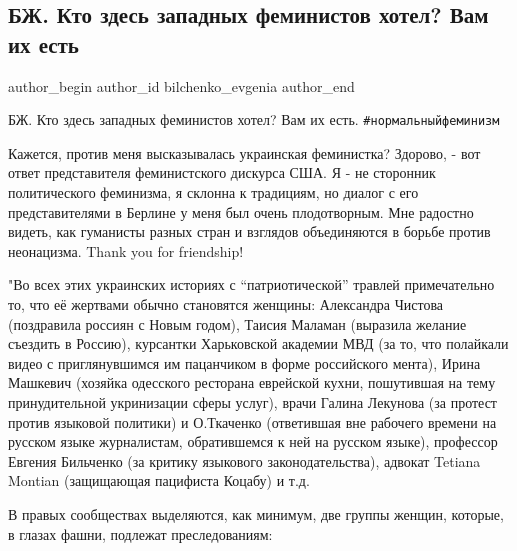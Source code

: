  
 
 
 
 
 
\subsection{БЖ. Кто здесь западных феминистов хотел? Вам их есть}
\label{sec:30_01_2021.fb.bilchenko_evgenia.1.feminizm_ukraina_zapad_travlja}
\ifcmt
 author_begin
   author_id bilchenko_evgenia
 author_end
\fi

БЖ. Кто здесь западных феминистов хотел? Вам их есть. \verb|#нормальныйфеминизм|

Кажется, против меня высказывалась украинская феминистка? Здорово, - вот ответ
представителя феминистского дискурса США. Я - не сторонник политического
феминизма, я склонна к традициям, но диалог с его представителями в Берлине у
меня был очень плодотворным. Мне радостно видеть, как гуманисты разных стран и
взглядов объединяются в борьбе против неонацизма. Thank you for friendship!

"Во всех этих украинских историях с \enquote{патриотической} травлей
примечательно то, что её жертвами обычно становятся женщины: Александра Чистова
(поздравила россиян с Новым годом), Таисия Маламан (выразила желание съездить в
Россию), курсантки Харьковской академии МВД (за то, что полайкали видео с
приглянувшимся им пацанчиком в форме российского мента), Ирина Машкевич
(хозяйка одесского ресторана еврейской кухни, пошутившая на тему принудительной
укринизации сферы услуг), врачи Галина Лекунова (за протест против языковой
политики) и О.Ткаченко (ответившая вне рабочего времени на русском языке
журналистам, обратившемся к ней на русском языке), профессор Евгения Бильченко
(за критику языкового законодательства), адвокат Tetiana  Montian (защищающая
пацифиста Коцабу) и т.д.

В правых сообществах выделяются, как минимум, две группы женщин, которые, в глазах фашни, подлежат преследованиям:

